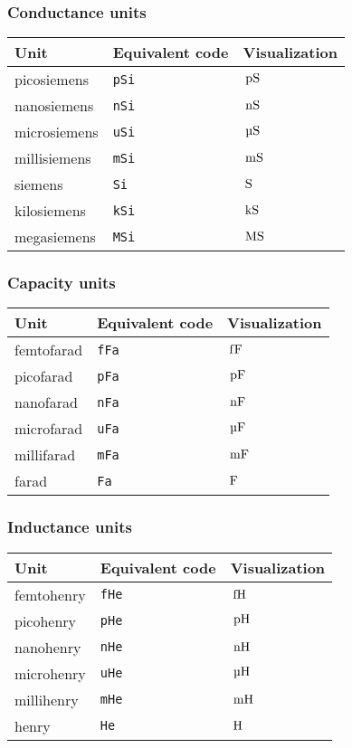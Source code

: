 \documentclass[11pt,a4paper,openany]{book}
\newcommand*{\cs}[1]{\texttt{\char92#1}}
\begin{document}
\subsubsection{Conductance units}
\begin{center}
\begin{tabular}{lll}
\toprule
Unit & Equivalent code & Visualization\\
\midrule
picosiemens & \cs{pSi} & $\,\mathrm{pS}$\\
nanosiemens & \cs{nSi} & $\,\mathrm{nS}$ \\
microsiemens &\cs{uSi} & $\uSi$ \\
millisiemens & \cs{mSi} & $\,\mathrm{mS}$ \\
siemens & \cs{Si} & $\,\mathrm{S}$\\
kilosiemens & \cs{kSi} & $\,\mathrm{kS}$\\
megasiemens & \cs{MSi} & $\,\mathrm{MS}$\\
\bottomrule
\end{tabular}
\end{center}
\subsubsection{Capacity units} 
\begin{center}
\begin{tabular}{lll}
\toprule
Unit & Equivalent code & Visualization\\
\midrule
femtofarad & \cs{fFa} & $\,\mathrm{f\/F}$ \\
picofarad & \cs{pFa} & $\,\mathrm{pF}$\\
nanofarad & \cs{nFa} & $\,\mathrm{nF}$ \\
microfarad & \cs{uFa} & $\uFa$\\
millifarad & \cs{mFa} & $\,\mathrm{mF}$ \\
farad & \cs{Fa} & $\,\mathrm{F}$\\
\bottomrule
\end{tabular}
\end{center}
\subsubsection{Inductance units}
\begin{center}
\begin{tabular}{lll}
\toprule
Unit & Equivalent code & Visualization\\
\midrule
femtohenry & \cs{fHe} & $\,\mathrm{fH}$ \\
picohenry & \cs{pHe} & $\,\mathrm{pH}$\\
nanohenry & \cs{nHe} & $\,\mathrm{nH}$ \\
microhenry & \cs{uHe} & $\uHe$\\
millihenry & \cs{mHe} & $\,\mathrm{mH}$ \\
henry & \cs{He} & $\,\mathrm{H}$\\
\bottomrule
\end{tabular}
\end{center}
\end{document}
